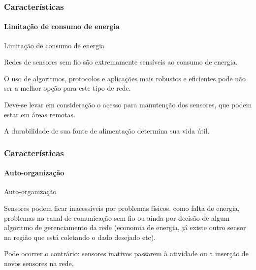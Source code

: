 \documentclass[notes]{beamer}
\begin{document}
\begin{frame}
\label{slide_20}
\frametitle{Características}
\framesubtitle{Limitação de consumo de energia}

\begin{block}{Limitação de consumo de energia}

Redes de sensores sem fio são extremamente sensíveis ao consumo de energia. 
\end{block} \pause
\begin{block}

O uso de algoritmos, protocolos e aplicações mais robustos e eficientes pode não ser a melhor opção para este tipo de rede. 

\end{block} \pause

\begin{block}

Deve-se levar em consideração o acesso para manutenção dos sensores, que podem estar em áreas remotas.

\end{block} \pause

\begin{block}

A durabilidade de sua fonte de alimentação determina sua vida útil.

\end{block}

\end{frame}

\begin{frame}
\label{slide_21}
\frametitle{Características}
\framesubtitle{Auto-organização}

\begin{block}{Auto-organização}

Sensores podem ficar inacessíveis por problemas físicos, como falta de energia, problemas no canal de comunicação sem fio ou ainda por decisão de algum algoritmo de gerenciamento da rede (economia de energia, já existe outro sensor na região que está coletando o dado desejado etc). 

\end{block} \pause

\begin{block}

Pode ocorrer o contrário: sensores inativos passarem à atividade ou a inserção de novos sensores na rede. 
\end{block} 

\end{frame}
\end{document}
